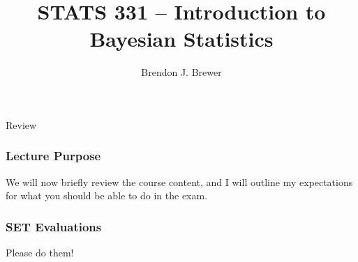 \documentclass{beamer}
\author{Brendon J. Brewer}
\title{STATS 331 -- Introduction to Bayesian Statistics}
\institute{The University of Auckland}
\date{}
\begin{document}
\frame{\titlepage}

\begin{frame}
\Large

\begin{center}
Review
\end{center}
\end{frame}

\begin{frame}
\frametitle{Lecture Purpose}

We will now briefly review the course content, and I will outline my
expectations for what you should be able to do in the exam.

\end{frame}

\begin{frame}
\frametitle{SET Evaluations}
Please do them!

\end{frame}
\end{document}
